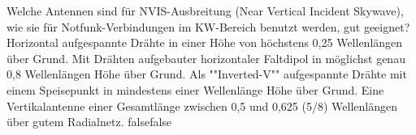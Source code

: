     {Welche Antennen sind für NVIS-Ausbreitung (Near Vertical Incident Skywave), wie sie für Notfunk-Verbindungen im KW-Bereich benutzt werden, gut geeignet?}
    {Horizontal aufgespannte Drähte in einer Höhe von höchstens 0,25 Wellenlängen über Grund.}
    {Mit Drähten aufgebauter horizontaler Faltdipol in möglichst genau 0,8 Wellenlängen Höhe über Grund.}
    {Als ""Inverted-V"" aufgespannte Drähte mit einem Speisepunkt in mindestens einer Wellenlänge Höhe über Grund.}
    {Eine Vertikalantenne einer Gesamtlänge zwischen 0,5 und 0,625 (5/8) Wellenlängen über gutem Radialnetz.}
    {false}{false}